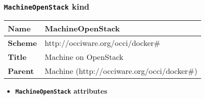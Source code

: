 \subsubsection{\texttt{MachineOpenStack} kind}
\begin{center}
\begin{tabular}{|l|l|}
  \hline
  \textbf{Name} & MachineOpenStack \\
  \hline  
  \textbf{Scheme} & http://occiware.org/occi/docker\# \\
  \hline
  \textbf{Title} & Machine on OpenStack \\
  \hline
  \textbf{Parent} & Machine (http://occiware.org/occi/docker\#) \\
  \hline
\end{tabular}
\end{center}
\begin{itemize}
\item \textbf{\texttt{MachineOpenStack} attributes}


\end{itemize}
